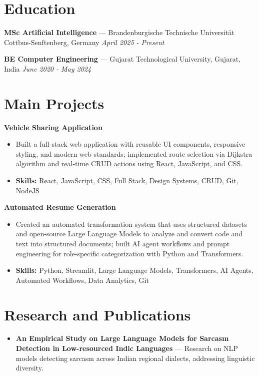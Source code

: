 \documentclass[a4paper,10pt]{article}
\begin{document}
\section*{Education}
\textbf{MSc Artificial Intelligence} — Brandenburgische Technische Universität Cottbus-Senftenberg, Germany \hfill \textit{April 2025 - Present}\par
\vspace{1.5pt}
\textbf{BE Computer Engineering} — Gujarat Technological University, Gujarat, India \hfill \textit{June 2020 - May 2024}\par

\section*{Main Projects}
\textbf{Vehicle Sharing Application}\par
\vspace{1pt}
\begin{itemize}
  \item Built a full-stack web application with reusable UI components, responsive styling, and modern web standards; implemented route selection via Dijkstra algorithm and real-time CRUD actions using React, JavaScript, and CSS.
  \item \textbf{Skills:} React, JavaScript, CSS, Full Stack, Design Systems, CRUD, Git, NodeJS
\end{itemize}
\vspace{3pt}
\textbf{Automated Resume Generation}\par
\vspace{1pt}
\begin{itemize}
  \item Created an automated transformation system that uses structured datasets and open-source Large Language Models to analyze and convert code and text into structured documents; built AI agent workflows and prompt engineering for role-specific categorization with Python and Transformers.
  \item \textbf{Skills:} Python, Streamlit, Large Language Models, Transformers, AI Agents, Automated Workflows, Data Analytics, Git
\end{itemize}

\section*{Research and Publications}
\begin{itemize}
\item \textbf{An Empirical Study on Large Language Models for Sarcasm Detection in Low-resourced Indic Languages} — Research on NLP models detecting sarcasm across Indian regional dialects, addressing linguistic diversity.
\end{itemize}
\end{document}
